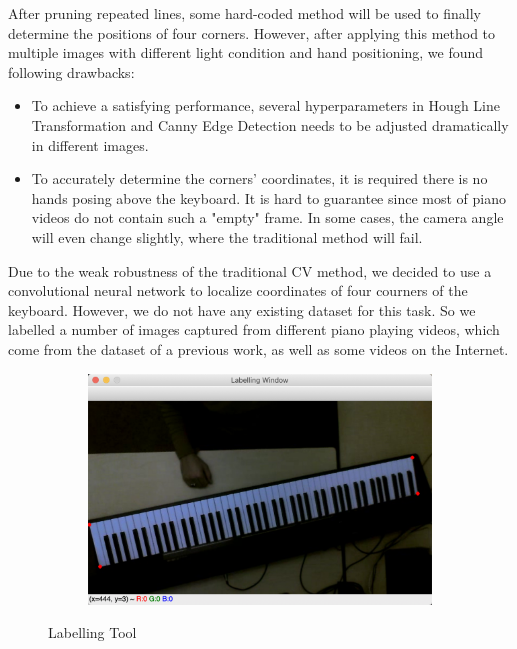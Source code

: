 \documentclass[10pt,twocolumn,letterpaper]{article}
\begin{document}
After pruning repeated lines, some hard-coded method will be used to finally determine the positions of four corners. However, after applying this method to multiple images with different light condition and hand positioning, we found following drawbacks:

\begin{itemize}
  \item To achieve a satisfying performance, several hyperparameters in Hough Line Transformation and Canny Edge Detection needs to be adjusted dramatically in different images.
  \item To accurately determine the corners' coordinates, it is required there is no hands posing above the keyboard. It is hard to guarantee since most of piano videos do not contain such a "empty" frame. In some cases, the camera angle will even change slightly, where the traditional method will fail.
\end{itemize}

Due to the weak robustness of the traditional CV method, we decided to use a convolutional neural network to localize coordinates of four courners of the keyboard. However, we do not have any existing dataset for this task. So we labelled a number of images captured from different piano playing videos, which come from the dataset of a previous work, as well as some videos on the Internet.

\begin{figure}[h!]
  \hspace{2.1cm}
  \begin{subfigure}{0.24\textwidth}
    \includegraphics[width=\linewidth]{fig/7.png}      
  \end{subfigure}
  \caption{Labelling Tool}
\end{figure}
\end{document}
